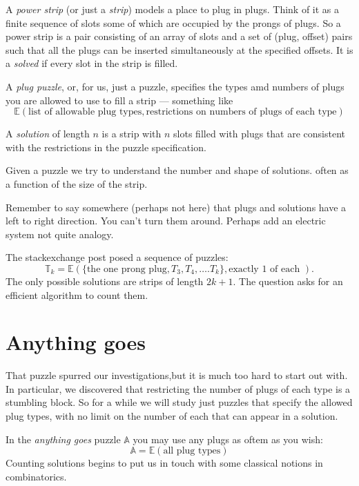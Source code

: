 \documentclass[10pt]{article}
\numberwithin{equation}{section}
\newenvironment{anote}
               {{\textcolor{blue}{Note:}}
                 \itshape
               }
               {}
\newcommand{\puzzle}[1]{%
   \ensuremath{
   \mathbb{#1}
   }
}
\begin{document}
 A \emph{power strip} (or just a \emph{strip}) models a place to plug
 in plugs. Think of it as a finite sequence of slots some of
 which are occupied by the prongs of plugs. So a power strip
is a pair consisting of an array of slots and a set of (plug, offset)
pairs such that all the plugs can be inserted simultaneously at
 the specified offsets. It is a \emph{solved} if
 every slot in the strip is filled.

A \emph{plug puzzle}, or, for us, just a puzzle, specifies the types amd numbers of plugs you are allowed to use to fill a strip --- something like
\begin{equation*}
    \puzzle{E}(\text{list of allowable plug types},\text{restrictions on numbers of plugs of each type})
\end{equation*}

A \emph{solution} of length $n$ is a strip with $n$ slots filled with plugs that are consistent with the restrictions in the puzzle specification.


Given a puzzle we try to understand the number and shape of solutions. often as
  a function of the size of the strip.

\begin{anote}
Remember to say somewhere (perhaps not here) that plugs and solutions have a left to right direction. You can't turn them around. Perhaps add an electric system not quite analogy.
\end{anote}

The stackexchange post posed a sequence of puzzles:
\begin{equation*}
\mathbb{T}_k = \puzzle{E}( \{\text{the one prong plug}, T_3, T_4, \ldots. T_k\}, \text{exactly 1 of each } ).
\end{equation*}
The only possible solutions are strips of length $2k+1$. The question asks for an efficient algorithm to count them.

 \section{Anything goes}
 
That puzzle spurred our investigations,but it is much too hard to start out with. In particular, we discovered that restricting the number of plugs of each type is a stumbling block. So for a while we will study just puzzles that specify the allowed plug types, with no limit on the number of each that can appear in a solution.

In the \emph{anything goes}  puzzle $\puzzle{A}$  you may use any plugs as oftem as you wish:
\begin{equation*}
  \puzzle{A}  = \puzzle{E}(\text{all plug types} )
\end{equation*}
Counting solutions begins to put us in touch with some classical notions
in combinatorics.
\end{document}
